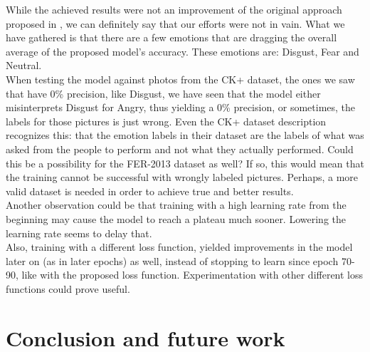 \documentclass[runningheads,a4paper,11pt]{report}
\begin{document}
\pagebreak



While the achieved results were not an improvement of the original approach proposed in \cite{Arriaga17}, we can definitely say that our efforts were not in vain. What we have gathered is that there are a few emotions that are dragging the overall average of the proposed model's accuracy. These emotions are: Disgust, Fear and Neutral.\\
When testing the model against photos from the CK+ dataset, the ones we saw that have 0\% precision, like Disgust, we have seen that the model either misinterprets Disgust for Angry, thus yielding a 0\% precision, or sometimes, the labels for those pictures is just wrong. Even the CK+ dataset description recognizes this: that the emotion labels in their dataset are the labels of what was asked from the people to perform and not what they actually performed. Could this be a possibility for the FER-2013 dataset as well? If so, this would mean that the training cannot be successful with wrongly labeled pictures.
Perhaps, a more valid dataset is needed in order to achieve true and better results.\\
Another observation could be that training with a high learning rate from the beginning may cause the model to reach a plateau much sooner. Lowering the learning rate seems to delay that.\\
Also, training with a different loss function, yielded improvements in the model later on (as in later epochs) as well, instead of stopping to learn since epoch 70-90, like with the proposed loss function. Experimentation with other different loss functions could prove useful.

\chapter{Conclusion and future work}
\label{chapter:concl}




\end{document}
